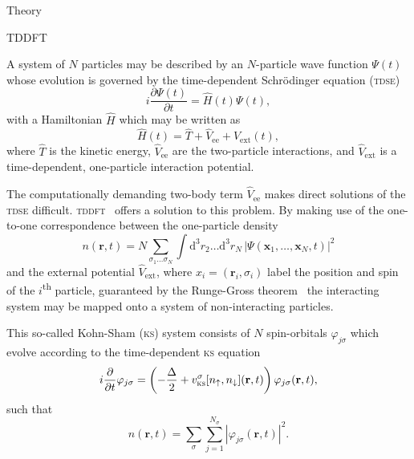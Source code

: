 \documentclass[aps, pra, reprint, groupedaddress, amsfonts, longbibliography,
               amsmath, amssymb, showpacs, nofootinbib]{revtex4-1}
\begin{document}
\begin{section}{Theory \label{sec:theory}}

   \begin{subsection}{TDDFT \label{sec:tddft}}

      A system of $N$ particles may be described by an $N$-particle wave function $\Psi(t)$ whose
      evolution is governed by the time-dependent Schr\"{o}dinger equation (\textsc{tdse})
      \begin{equation} \label{eq:tdse}
         i \frac{\partial \Psi(t)}{\partial t} = \hat{H}(t) \Psi(t),
      \end{equation}
      with a Hamiltonian $\hat{H}$ which may be written as
      \begin{equation} \label{eq:ham}
         \hat{H}(t) = \hat{T} + \hat{V}_\mathrm{ee} + \hat{V}_\mathrm{ext}(t),
      \end{equation}
      where $\hat{T}$ is the kinetic energy, $\hat{V}_\mathrm{ee}$ are the two-particle interactions,
      and $\hat{V}_\mathrm{ext}$ is a time-dependent, one-particle interaction potential.

      The computationally demanding two-body term $\hat{V}_\mathrm{ee}$ makes direct solutions of the
      \textsc{tdse} difficult. \textsc{tddft}~\cite{tddft, ullrich} offers a solution to this problem.
      By making use of the one-to-one correspondence between the one-particle density
      \begin{equation} \label{eq:dendef}
         n(\mathbf{r},t) = N \sum\limits_{\sigma_1 \dots \sigma_N} \int \mathrm{d}^3 r_2 \dots
                             \mathrm{d}^3 r_N \,
                             \left| \Psi(\mathbf{x}_1,\dots, \mathbf{x}_N,t) \right|^2
      \end{equation}
      and the external potential $\hat{V}_\mathrm{ext}$, where $x_i = (\mathbf{r}_i, \sigma_i)$ label
      the position and spin of the $i$\textsuperscript{th} particle, guaranteed by the Runge-Gross
      theorem~\cite{rg_theorem, td-spindep} the interacting system may be mapped onto a system of
      non-interacting particles.

      This so-called Kohn-Sham (\textsc{ks}) system consists of $N$ spin-orbitals $\varphi_{j \sigma}$
      which evolve according to the time-dependent \textsc{ks} equation
      \begin{equation} \label{eq:tdks}
         i \frac{\partial}{\partial t} \varphi_{j\sigma} = \left( -\frac{\Delta}{2} +
               v^\sigma_\mathrm{\textsc{ks}}[n_\uparrow, n_\downarrow](\mathbf{r},t)
               \right) \varphi_{j\sigma}(\mathbf{r},t),
      \end{equation}
      such that
      \begin{equation} \label{eq:ksden}
         n(\mathbf{r},t) = \sum\limits_\sigma \sum\limits_{j=1}^{N_\sigma}
                           \left| \varphi_{j\sigma}(\mathbf{r},t) \right|^2.
      \end{equation}


\end{subsection}
\end{section}
\end{document}
